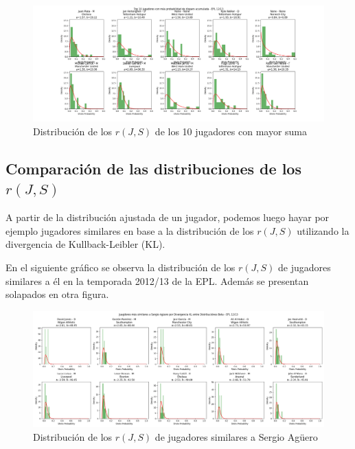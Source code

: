 \documentclass[
  a4paper,
]{article}
\begin{document}
\begin{figure}
  \includegraphics{recursos_pdf/graficos/Top_10_by_sum_players_shots_prob_beta_binomial.png}
    \caption{Distribución de los $r(J, S)$ de los 10 jugadores con mayor suma}
\end{figure}

\hypertarget{comparaciuxf3n-de-las-distribuciones-de-los-rj-s}{%
\subsection{\texorpdfstring{Comparación de las distribuciones de los
\(r(J, S)\)}{Comparación de las distribuciones de los r(J, S)}}\label{comparaciuxf3n-de-las-distribuciones-de-los-rj-s}}

A partir de la distribución ajustada de un jugador, podemos luego hayar
por ejemplo jugadores similares en base a la distribución de los
\(r(J, S)\) utilizando la divergencia de Kullback-Leibler (KL).

En el siguiente gráfico se observa la distribución de los \(r(J, S)\) de
jugadores similares a él en la temporada 2012/13 de la EPL. Además se
presentan solapados en otra figura.

\begin{figure}
  \includegraphics{recursos_pdf/graficos/Similar_to_Sergio_Aguero_shots_prob_beta_binomial.png}
    \caption{Distribución de los $r(J, S)$ de jugadores similares a Sergio Agüero}
\end{figure}
\end{document}
